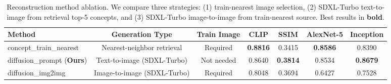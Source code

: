 \begin{table}[htbp]
\centering
\caption{Reconstruction method ablation. We compare three strategies: (1) train-nearest image selection, (2) SDXL-Turbo text-to-image from retrieval top-5 concepts, and (3) SDXL-Turbo image-to-image from train-nearest source. Best results in \textbf{bold}.}
\label{tab:reconstruction_ablation}
\begin{tabular}{lcccccc}
\toprule
\textbf{Method} & \textbf{Generation Type} & \textbf{Train Image} & \textbf{CLIP} & \textbf{SSIM} & \textbf{AlexNet-5} & \textbf{Inception} \\
\midrule
concept\_train\_nearest & Nearest-neighbor retrieval & Required & \textbf{0.8816} & 0.3415 & \textbf{0.8586} & 0.8390 \\
diffusion\_prompt (\textbf{Ours}) & Text-to-image (SDXL-Turbo) & Not needed & 0.8640 & \textbf{0.3814} & 0.8534 & \textbf{0.8679} \\
diffusion\_img2img & Image-to-image (SDXL-Turbo) & Required & 0.8048 & 0.3694 & 0.6427 & 0.7528 \\
\bottomrule
\end{tabular}
\end{table}
